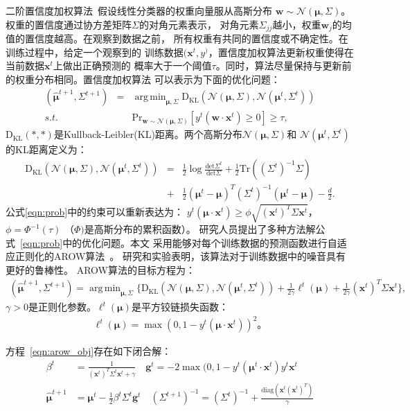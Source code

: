 \documentclass[doctor]{ustcthesis}
\def \g  {\mathbf{g}}
\def \w  {\mathbf{w}}
\def \x {\mathbf{x}}
\DeclareMathOperator*{\argmin}{arg\,min}
\def \Mu {\pmb{\mu}}
\def \Nn {\mathcal{N}}
\def \diag{\mathrm{diag}}
\def \Pr   {\mathrm{Pr}}
\def \DKL   {\mathrm{D_{KL}}}
\begin{document}
二阶置信度加权算法~\cite{dredze2008confidence}假设线性分类器的权重向量服从高斯分布
$\w\sim \Nn(\Mu, \Sigma)$。权重的置信度通过协方差矩阵$\Sigma$的对角元素表示，
对角元素$\Sigma_{jj}$越小，权重$\w_j$的均值的置信度越高。在观察到数据之前，
所有权重有共同的置信度或不确定性。在训练过程中，给定一个观察到的
训练数据$(\x^t,y^)$，置信度加权算法更新权重使得在当前数据$\x^t$上做出正确预测的
概率大于一个阈值$\tau$。同时，算法尽量保持与更新前的权重分布相同。置信度加权算法
可以表示为下面的优化问题：
\begin{eqnarray} \label{eqn:prob}
    (\hat{\Mu}^{t+1},\Sigma^{t+1}) &=&
    \argmin_{\Mu,\Sigma}{\DKL(\Nn(\Mu,\Sigma), \Nn(\Mu^t,\Sigma^t))}
    \nonumber \\
    s.t. &&\Pr_{\w\sim\Nn(\Mu,\Sigma)}[y^t(\w\cdot \x^t) \geq 0]  \geq \tau,
\end{eqnarray}
$\DKL(*,*)$是Kullback-Leibler(KL)距离。两个高斯分布$\Nn(\Mu,\Sigma)$和
$\Nn(\Mu^t,\Sigma^t)$的KL距离定义为：
\begin{eqnarray}
    \DKL(\Nn(\Mu,\Sigma), \Nn(\Mu^t,\Sigma^t)) &=&
    \frac{1}{2}\log{\frac{\text{det}\Sigma^t}{\text{det}\Sigma}}
    + \frac{1}{2}\text{Tr}((\Sigma^t)^{-1}\Sigma) \nonumber \\
    &+& \frac{1}{2}(\Mu^t - \Mu)^T(\Sigma^t)^{-1}(\Mu^t - \Mu) - \frac{d}{2}.
\end{eqnarray}
公式\eqref{eqn:prob}中的约束可以重新表达为：
$y^t(\Mu\cdot \x^t)  \geq  \phi\sqrt{(\x^t)^T\Sigma\x^t}$，
$\phi = \Phi^{-1}(\tau)$ （$\Phi)$是高斯分布的累积函数）。
研究人员提出了多种方法解公式~\eqref{eqn:prob}中的优化问题。本文
采用能够对每个训练数据的预测函数进行自适应正则化的AROW算法~\cite{crammer2009adaptive}。
研究和实验表明，该算法对于训练数据中的噪音具有更好的鲁棒性。
AROW算法的目标方程为：
\begin{eqnarray}
    (\hat{\Mu}^{t+1},\Sigma^{t+1}) =
    \argmin_{\Mu,\Sigma}\big\{\DKL(\Nn(\Mu,\Sigma),
    \Nn(\Mu^t,\Sigma^t))
    + \frac{1}{2\gamma}\ell^t(\Mu) + \frac{1}{2\gamma}(\x^t)^T\Sigma\x^t\big\},
    \label{eqn:arow_obj}
\end{eqnarray}
$\gamma > 0$是正则化参数。$\ell^t(\Mu)$是平方铰链损失函数：
\begin{eqnarray}
    \ell^t(\Mu) = \max(0,1 - y^t(\Mu \cdot \x^t))^2。
\end{eqnarray}

方程~\eqref{eqn:arow_obj}存在如下闭合解：
\begin{eqnarray}
    \label{equ:arow_solu}
    \beta^t &= \frac{1}{(\x^t)^T\Sigma^{t}\x^t + \gamma} \quad \g^t  =
    -2\max(0, 1 - y^t (\Mu^{t} \cdot \x^t) y^t\x^t \nonumber \\
    \hat{\Mu}^{t+1} &= \Mu^{t} - \frac{1}{2}\beta^t\Sigma^{t}\g^t \quad
    (\Sigma^{t+1})^{-1} = (\Sigma^t)^{-1} + \frac{\diag(\x^t(\x^t)^T)}{\gamma}
\end{eqnarray}
\end{document}
